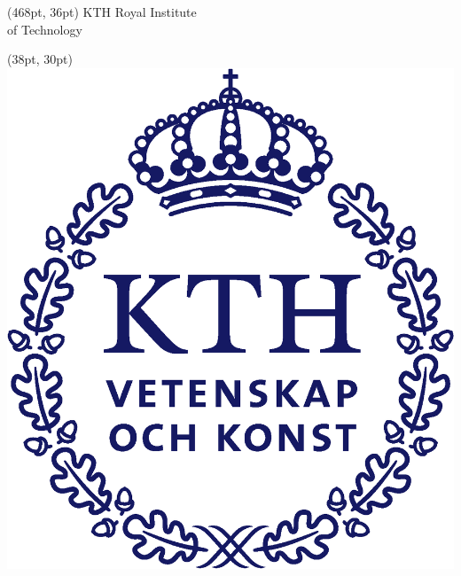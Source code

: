 \makeatletter
\begin{titlepage}
    
    \thispagestyle{empty}
    \begin{textblock*}{120pt}(468pt, 36pt) %
    \colvillebold \small KTH Royal Institute \\of Technology
    \end{textblock*}
    
    \begin{textblock*}{72.85pt}(38pt, 30pt) %
    \includegraphics[width=0.13\paperwidth]{setup/img/KTH_logo_CMYK_bla.eps}
    \end{textblock*}
     

\end{titlepage}
